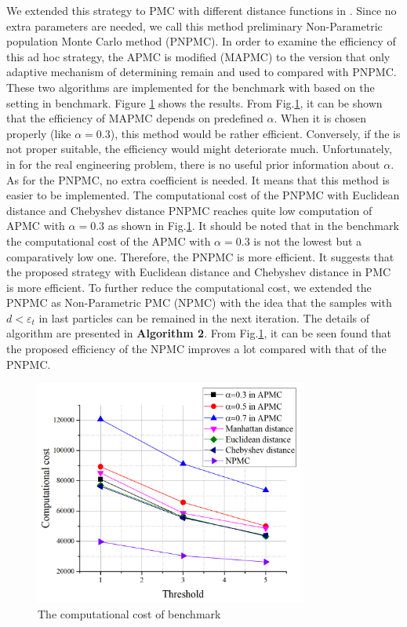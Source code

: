 \documentclass[review]{elsarticle}
\begin{document}
We extended this strategy to PMC with different distance functions in \cite{lenormand2013adaptive}. Since no extra parameters are needed, we call this method preliminary Non-Parametric population Monte Carlo method (PNPMC). In order to examine the efficiency of this ad hoc strategy, the APMC\cite{lenormand2013adaptive} is modified (MAPMC) to the version that only adaptive mechanism of determining remain and used to compared with PNPMC. These two algorithms are implemented for the benchmark with based on the setting in benchmark. Figure \ref{fig:bench_cost} shows the results. From Fig.\ref{fig:bench_cost}, it can be shown that the efficiency of MAPMC depends on predefined $\alpha$. When it is chosen properly (like $\alpha=0.3$), this method would be rather efficient. Conversely, if the is not proper suitable, the efficiency would might deteriorate much. Unfortunately, in for the real engineering problem, there is no useful prior information about $\alpha$. As for the PNPMC, no extra coefficient is needed. It means that this method is easier to be implemented. The computational cost of the PNPMC with Euclidean distance and Chebyshev distance PNPMC reaches quite low computation of APMC with  $\alpha=0.3$  as shown in Fig.\ref{fig:bench_cost}. It should be noted that in the benchmark the computational cost of the APMC with $\alpha=0.3$ is not the lowest but a comparatively low one. Therefore, the PNPMC is more efficient. It suggests that the proposed strategy with Euclidean distance and Chebyshev distance in PMC is more efficient. To further reduce the computational cost, we extended the PNPMC as Non-Parametric PMC (NPMC) with the idea that the samples with $d<\varepsilon_t$ in last particles can be remained in the next iteration\cite{lenormand2013adaptive}. The details of algorithm are presented in \textbf{Algorithm 2}. From Fig.\ref{fig:bench_cost}, it can be seen found that the proposed efficiency of the NPMC improves a lot compared with that of the PNPMC.

\begin{figure}
    \centering
    \includegraphics[width=0.8\textwidth]{fig/bench-cost.png}
    \caption{The computational cost of benchmark}
    \label{fig:bench_cost}
\end{figure}
\end{document}
